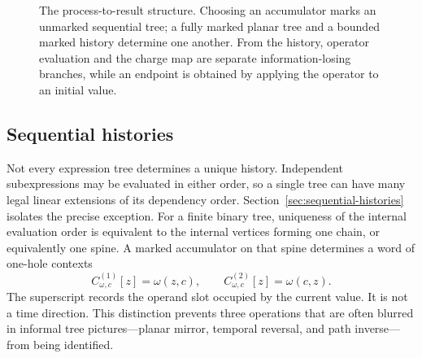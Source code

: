 \begin{figure}[t]
\centering
{}
\caption{The process-to-result structure.  Choosing an accumulator marks an
unmarked sequential tree; a fully marked planar tree and a bounded marked
history determine one another.  From the history, operator evaluation and the
charge map are separate information-losing branches, while an endpoint is
obtained by applying the operator to an initial value.}
\label{fig:process-result-structure}
\end{figure}

\subsection{Sequential histories}

Not every expression tree determines a unique history.  Independent subexpressions
may be evaluated in either order, so a single tree can have many legal linear
extensions of its dependency order.  Section~\ref{sec:sequential-histories} isolates
the precise exception.  For a finite binary tree, uniqueness of the internal
evaluation order is equivalent to the internal vertices forming one chain, or
equivalently one spine.  A marked accumulator on that spine determines a word of
one-hole contexts
\[
 C_{\omega,c}^{(1)}[z]=\omega(z,c),
 \qquad
 C_{\omega,c}^{(2)}[z]=\omega(c,z).
\]
The superscript records the operand slot occupied by the current value.  It is not a
time direction.  This distinction prevents three operations that are often blurred
in informal tree pictures---planar mirror, temporal reversal, and path inverse---from
being identified.

